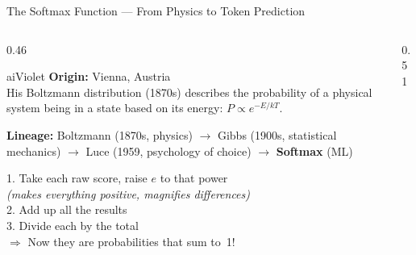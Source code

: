 \begin{frame}[shrink=16]{The Softmax Function --- From Physics to Token Prediction}

  \begin{columns}[T]
    \begin{column}{0.46\textwidth}
      \begin{personbox}{aiViolet}
        \textbf{Origin:} Vienna, Austria\\[3pt]
        His \alert{Boltzmann distribution} (1870s) describes the
        probability of a physical system being in a state based on its
        energy: \(P \propto e^{-E/kT}\).
      \end{personbox}

      \vspace{0.3em}
      {\footnotesize
      \textbf{Lineage:}
      Boltzmann (1870s, physics) \(\to\)
      Gibbs (1900s, statistical mechanics) \(\to\)
      Luce (1959, psychology of choice) \(\to\)
      \textbf{Softmax} (ML)}

      \vspace{0.3em}
      \begin{tcolorbox}[colback=aiViolet!5, colframe=aiViolet!60,
        fonttitle=\bfseries\small, title={Recipe: Softmax},
        rounded corners, boxrule=0.5pt, left=3pt, right=3pt, top=2pt, bottom=2pt]
        \footnotesize
        1. Take each raw score, raise $e$ to that power\\
        {\scriptsize\itshape (makes everything positive, magnifies differences)}\\
        2. Add up all the results\\
        3. Divide each by the total\\[2pt]
        \(\Rightarrow\) Now they are probabilities that sum to~1!
      \end{tcolorbox}
    \end{column}

    \begin{column}{0.51\textwidth}
\end{column}
\end{columns}
\end{frame}
